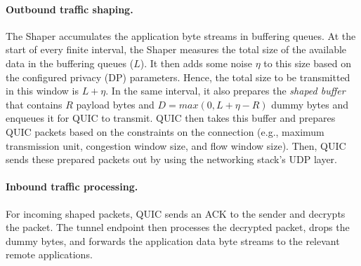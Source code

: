 \paragraph{Outbound traffic shaping.}
The Shaper accumulates the application byte streams in buffering queues.
At the start of every finite interval, the Shaper measures the total size of the available data in the buffering queues ($L$). 
It then adds some noise $\eta$ to this size based on the configured privacy (DP) parameters.
Hence, the total size to be transmitted in this window is $L + \eta$.
In the same interval, it also prepares the \textit{shaped buffer} that contains $R$ payload bytes and $D = max(0, L + \eta - R)$ dummy bytes and enqueues it for QUIC to transmit.
QUIC then takes this buffer and prepares QUIC packets based on the constraints on the connection (e.g., maximum transmission unit, congestion window size, and flow window size).
Then, QUIC sends these prepared packets out by using the networking stack's UDP layer.

\paragraph{Inbound traffic processing.}
For incoming shaped packets, QUIC sends an ACK to the sender and decrypts the packet.
The tunnel endpoint then processes the decrypted packet, drops the dummy bytes, and forwards the application data byte streams to the relevant remote applications.
